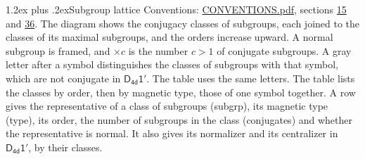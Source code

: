 \documentclass[10pt,a4paper]{article}
\makeatletter
\renewcommand\section{\@startsection{section}{1}{\z@}{-3ex plus -1ex minus -.2ex}%
  {1.2ex plus .2ex}{\normalfont\large\sffamily\bfseries\color{parttitle}}}
\numberwithin{equation}{section}
\newcommand{\grp}[1]{\mathsf{#1}}
\makeatother
\begin{document}
\section{Subgroup lattice}\label{s:subgroups}
Conventions: \href{../../CONVENTIONS.pdf}{CONVENTIONS.pdf}, sections \href{../../../rotation/CONVENTIONS.pdf\#conv.15}{15} and \href{../../CONVENTIONS.pdf\#conv.36}{36}.
The diagram shows the conjugacy classes of subgroups, each joined to the classes of its maximal subgroups, and the orders increase upward. \label{n:index.conjugates.c}\label{n:mark.conjugates}A normal subgroup is framed, and ${\times}c$ is the number $c > 1$ of conjugate subgroups. \label{n:mark.letter}A gray letter after a symbol distinguishes the classes of subgroups with that symbol, which are not conjugate in $\grp{D_{4d}1'}$. The table uses the same letters. The table lists the classes by order, then by magnetic type, those of one symbol together. \label{n:head.subgroup}\label{n:head.magnetic.type}\label{n:head.order}\label{n:head.conjugates}\label{n:head.normal}A row gives the representative of a class of subgroups (subgrp), its magnetic type (type), its order, the number of subgroups in the class (conjugates) and whether the representative is normal. \label{n:head.normalizer}\label{n:head.centralizer}It also gives its normalizer and its centralizer in $\grp{D_{4d}1'}$, by their classes. 
\end{document}
